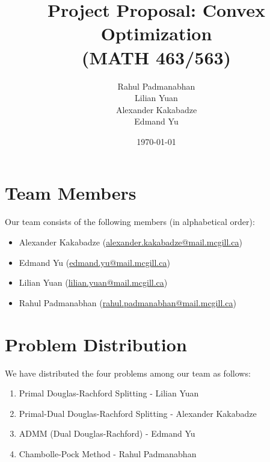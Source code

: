 \documentclass[12pt]{article}
\title{Project Proposal: Convex Optimization \\(MATH 463/563)}
\author{
    Rahul Padmanabhan\\
    Lilian Yuan\\
    Alexander Kakabadze\\
    Edmand Yu
}
\date{\today}
\begin{document}
\maketitle

\section{Team Members}
Our team consists of the following members (in alphabetical order):
\begin{itemize}
    \item Alexander Kakabadze (\href{mailto:alexander.kakabadze@mail.mcgill.ca}{alexander.kakabadze@mail.mcgill.ca})
    \item Edmand Yu (\href{mailto:edmand.yu@mail.mcgill.ca}{edmand.yu@mail.mcgill.ca})
    \item Lilian Yuan (\href{mailto:lilian.yuan@mail.mcgill.ca}{lilian.yuan@mail.mcgill.ca})
    \item Rahul Padmanabhan (\href{mailto:rahul.padmanabhan@mail.mcgill.ca}{rahul.padmanabhan@mail.mcgill.ca})
\end{itemize}

\section{Problem Distribution}
We have distributed the four problems among our team as follows:
\begin{enumerate}
    \item Primal Douglas-Rachford Splitting - Lilian Yuan
    \item Primal-Dual Douglas-Rachford Splitting - Alexander Kakabadze
    \item ADMM (Dual Douglas-Rachford) - Edmand Yu
    \item Chambolle-Pock Method - Rahul Padmanabhan
\end{enumerate}
\end{document}

